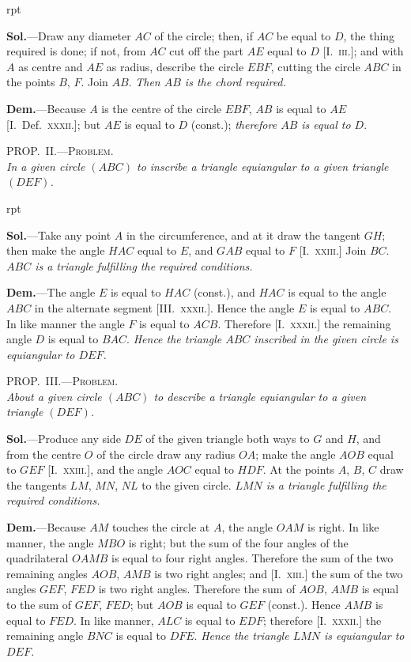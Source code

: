 \documentclass[oneside]{book}
\newcommand\myprop[2]{
\bigskip\Needspace*{4\baselineskip}\begin{center}\textsc{#1}\\\medskip\emph{#2}\par\end{center}
}
\newcommand\imgflow[3]{
\setcounter{wrapwidth}{#1}
\begin{wrapfigure}[#2]{r}{\value{wrapwidth}pt}
\begin{center}
\vspace{-0.3in}
\end{center}
\end{wrapfigure}
}
\newcommand\imgcent[2]{
\begin{center}
\end{center}
}
\begin{document}
\imgflow{180}{9}{f151}

\textbf{Sol.}---Draw any diameter $AC$ of the circle; then, if
$AC$ be equal to $D$,
the thing required is
done; if not, from $AC$
cut off the part $AE$
equal to $D$ [I.~\textsc{iii.}];
and with $A$ as centre
and $AE$ as radius, describe
the circle $EBF$,
cutting the circle $ABC$
in the points $B$, $F$. Join $AB$. \textit{Then $AB$ is the chord
required.}

\textbf{Dem.}---Because $A$ is the centre of the circle $EBF$,
$AB$ is equal to $AE$ [I.~Def.~\textsc{xxxii.}]; but $AE$ is equal
to $D$ (const.); \emph{therefore $AB$ is equal to $D$}.

\myprop{PROP\@.~II\@.---Problem.}{In a given circle $(ABC)$ to inscribe a triangle equiangular
to a given triangle $(DEF)$.}

\imgflow{170}{9}{f152}

\textbf{Sol.}---Take any point $A$ in the circumference, and
at it draw the tangent
$GH$; then make the
angle $HAC$ equal to
$E$, and $GAB$ equal to
$F$ [I.~\textsc{xxiii.}] Join $BC$.
\textit{$ABC$ is a triangle fulfilling
the required conditions.}

\textbf{Dem.}---The angle $E$ is equal to $HAC$ (const.), and
$HAC$ is equal to the angle $ABC$ in the alternate segment
[III\@.~\textsc{xxxii.}]. Hence the angle $E$ is equal to
$ABC$. In like manner the angle $F$ is equal to $ACB$.
Therefore [I.~\textsc{xxxii.}] the remaining angle $D$ is equal to
$BAC$. \textit{Hence the triangle $ABC$ inscribed in the given
circle is equiangular to $DEF$.}

\myprop{PROP\@.~III\@.---Problem.}{About a given circle $(ABC)$ to describe a triangle equiangular
to a given triangle $(DEF)$.}

\textbf{Sol.}---Produce any side $DE$ of the given triangle
both ways to $G$ and $H$, and from the centre $O$ of the
circle draw any radius $OA$; make the angle $AOB$
equal to $GEF$ [I.~\textsc{xxiii.}], and the angle $AOC$ equal to
$HDF$. At the points $A$, $B$, $C$ draw the tangents $LM$,
$MN$, $NL$ to the given circle. \emph{$LMN$ is a triangle fulfilling
the required conditions.}

\imgcent{230}{f153}

\textbf{Dem.}---Because $AM$ touches the circle at $A$, the
angle $OAM$ is right. In like manner, the angle $MBO$
is right; but the sum of the four angles of the quadrilateral
$OAMB$ is equal to four right angles. Therefore
the sum of the two remaining angles $AOB$, $AMB$
is two right angles; and [I.~\textsc{xiii.}] the sum of the two
angles $GEF$, $FED$ is two right angles. Therefore the
sum of $AOB$, $AMB$ is equal to the sum of $GEF$, $FED$;
but $AOB$ is equal to $GEF$ (const.). Hence $AMB$ is
equal to $FED$. In like manner, $ALC$ is equal to
$EDF$; therefore [I.~\textsc{xxxii.}] the remaining angle $BNC$
is equal to $DFE$. \textit{Hence the triangle $LMN$ is equiangular
to $DEF$.}
\end{document}
